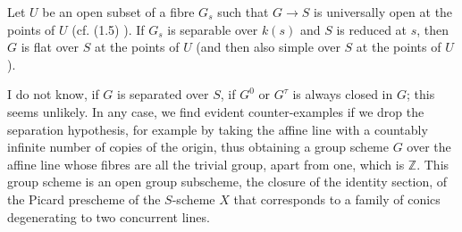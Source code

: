\begin{corollary}\label{fga3.vi-1-corollary-1.8}
    Let $U$ be an open subset of a fibre $G_s$ such that $G\to S$ is universally open at the points of $U$ (cf. (1.5) ).
    If $G_s$ is separable over $k(s)$ and $S$ is reduced at $s$, then $G$ is flat over $S$ at the points of $U$ (and then also simple over $S$ at the points of $U$).
\end{corollary}

\begin{remark}\label{fga3.vi-1-remarks-1.9}
    I do not know, if $G$ is separated over $S$, if $G^0$ or $G^\tau$ is always closed in $G$;
    this seems unlikely.
    In any case, we find evident counter-examples if we drop the separation hypothesis, for example by taking the affine line with a countably infinite number of copies of the origin, thus obtaining a group scheme $G$ over the affine line whose fibres are all the trivial group, apart from one, which is $\mathbb{Z}$.
    This group scheme is an open group subscheme, the closure of the identity section, of the Picard prescheme of the $S$-scheme $X$ that corresponds to a family of conics degenerating to two concurrent lines.


\end{remark}
